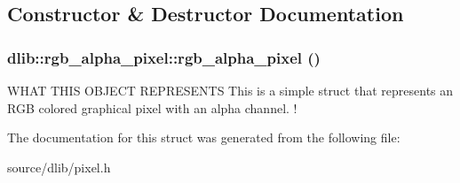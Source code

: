\subsection{Constructor \& Destructor Documentation}
\hypertarget{structdlib_1_1rgb__alpha__pixel_a3214ab60e949914276ca302c0a67d519}{
\subsubsection[{rgb\_\-alpha\_\-pixel}]{\setlength{\rightskip}{0pt plus 5cm}dlib::rgb\_\-alpha\_\-pixel::rgb\_\-alpha\_\-pixel ()}}
\label{structdlib_1_1rgb__alpha__pixel_a3214ab60e949914276ca302c0a67d519}
WHAT THIS OBJECT REPRESENTS This is a simple struct that represents an RGB colored graphical pixel with an alpha channel. ! 

The documentation for this struct was generated from the following file:\begin{DoxyCompactItemize}
\item 
source/dlib/pixel.h\end{DoxyCompactItemize}
